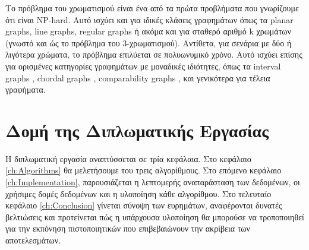 Το πρόβλημα του χρωματισμού είναι ένα από τα πρώτα προβλήματα που γνωρίζουμε ότι είναι NP-hard\cite{garey-johnson-np-completeness}. Αυτό ισχύει και για ιδικές κλάσεις γραφημάτων όπως τα planar graphs\cite{garey-johnson-stockmeyer-simplified-np}, line graphs\cite{holyer-np-completeness-edge-coloring}, regular graphs\cite{dailey-uniqueness-colorability-np-complete} ή ακόμα και για σταθερό αριθμό k χρωμάτων (γνωστό και ώς το πρόβλημα του 3-χρωματισμού)\cite{garey-johnson-stockmeyer-simplified-np}. Αντίθετα, για σενάρια με δύο ή λιγότερα χρώματα, το πρόβλημα επιλύεται σε πολυωνυμικό χρόνο. Αυτό ισχύει επίσης για ορισμένες κατηγορίες γραφημάτων με μοναδικές ιδιότητες, όπως τα interval graphs
\cite{golumbic-algorithmic-graph-theory-perfect-graphs}, chordal graphs \cite{golumbic-algorithmic-graph-theory-perfect-graphs}, comparability graphs \cite{golumbic-algorithmic-graph-theory-perfect-graphs}, και γενικότερα για τέλεια
γραφήματα\cite{grotschel-lovasz-schrijver-ellipsoid-method}. 



\section{Δομή της Διπλωματικής Εργασίας}
\label{sec:Structure}
Η διπλωματική εργασία αναπτύσσεται σε τρία κεφάλαια. Στο κεφάλαιο \ref{ch:Algorithms} θα μελετήσουμε του τρεις αλγορίθμους. Στο επόμενο κεφάλαιο \ref{ch:Implementation}, παρουσιάζεται η λεπτομερής αναπαράσταση των δεδομένων, οι χρήσιμες δομές δεδομένων και η υλοποίηση κάθε αλγορίθμου. Στο τελευταίο κεφάλαιο \ref{ch:Conclusion} γίνεται σύνοψη των ευρημάτων, αναφέρονται δυνατές βελτιώσεις και προτείνεται πώς η υπάρχουσα υλοποίηση θα μπορούσε να τροποποιηθεί για την εκπόνηση πιστοποιητικών που επιβεβαιώνουν την ακρίβεια των αποτελεσμάτων.